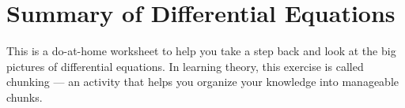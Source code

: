 \documentclass[../main.tex]{subfiles}
\begin{document}
 \section{Summary of Differential Equations}

This is a do-at-home worksheet to help you take a step back and look at the big pictures of differential equations.  In learning theory, this exercise is called chunking --- an activity that helps you organize your knowledge into manageable chunks. 
\end{document}
